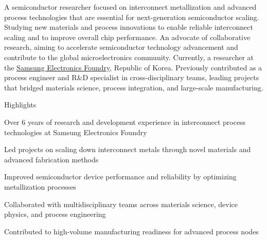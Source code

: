 


\begin{cvparagraph}

A semiconductor researcher focused on interconnect metallization and advanced process technologies 
that are essential for next-generation semiconductor scaling.  
Studying new materials and process innovations to enable reliable interconnect scaling 
and to improve overall chip performance.  
An advocate of collaborative research, aiming to accelerate semiconductor technology advancement 
and contribute to the global microelectronics community.  
Currently, a researcher at the \href{https://www.samsungfoundry.com}{Samsung Electronics Foundry}, Republic of Korea.  
Previously contributed as a process engineer and R\&D specialist in cross-disciplinary teams, 
leading projects that bridged materials science, process integration, and large-scale manufacturing.  
\end{cvparagraph}

\newcommand{\lineintv}{\vspace{0.0cm}} %

\cventry
  {} %
  {Highlights\vspace{-0.3cm}} %
  {} %
  {} %
  {
    \begin{cvitems} %
      \item {Over 6 years of research and development experience in interconnect process technologies at Samsung Electronics Foundry}
      \item {Led projects on scaling down interconnect metals through novel materials and advanced fabrication methods}
      \item {Improved semiconductor device performance and reliability by optimizing metallization processes}
      \item {Collaborated with multidisciplinary teams across materials science, device physics, and process engineering}
      \item {Contributed to high-volume manufacturing readiness for advanced process nodes}
    \end{cvitems}
  }

